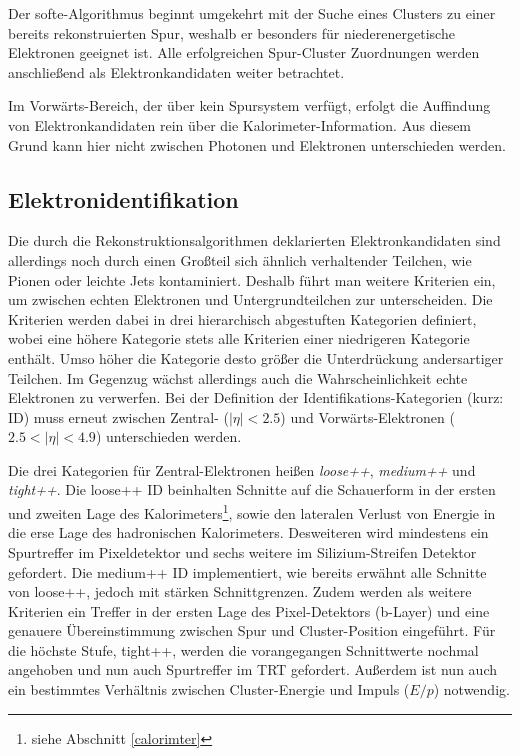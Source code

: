 Der softe-Algorithmus beginnt umgekehrt mit der Suche eines Clusters zu einer
bereits rekonstruierten Spur, weshalb er besonders für niederenergetische
Elektronen geeignet ist. Alle erfolgreichen Spur-Cluster Zuordnungen werden
anschließend als Elektronkandidaten weiter betrachtet.

Im Vorwärts-Bereich, der über kein Spursystem verfügt, erfolgt die Auffindung
von Elektronkandidaten rein über die Kalorimeter-Information. Aus diesem Grund
kann hier nicht zwischen Photonen und Elektronen unterschieden werden.



\subsection{Elektronidentifikation}
\label{identification}
Die durch die Rekonstruktionsalgorithmen deklarierten Elektronkandidaten
sind allerdings noch durch einen Großteil sich ähnlich verhaltender Teilchen,
wie Pionen oder leichte Jets kontaminiert. Deshalb führt man weitere Kriterien
ein, um zwischen echten Elektronen und Untergrundteilchen zur unterscheiden.
Die Kriterien werden dabei in drei hierarchisch abgestuften Kategorien
definiert, wobei eine höhere Kategorie stets alle Kriterien einer niedrigeren
Kategorie enthält. Umso höher die Kategorie desto größer die Unterdrückung
andersartiger Teilchen. Im Gegenzug wächst allerdings auch die
Wahrscheinlichkeit echte Elektronen zu verwerfen. Bei der Definition der
Identifikations-Kategorien (kurz: \acs{ID}) muss erneut zwischen Zentral-
($|\eta|<2.5$) und Vorwärts-Elektronen ($2.5<|\eta|<4.9$) unterschieden werden.

Die drei Kategorien für Zentral-Elektronen heißen \textit{loose++},
\textit{medium++} und \textit{tight++}. Die loose++ ID beinhalten Schnitte auf
die Schauerform in der ersten und zweiten Lage des Kalorimeters\footnote{siehe
Abschnitt \ref{calorimter}}, sowie den lateralen Verlust von Energie in die
erse Lage des hadronischen Kalorimeters. Desweiteren wird mindestens ein
Spurtreffer im Pixeldetektor und sechs weitere im Silizium-Streifen Detektor
gefordert. Die medium++ ID implementiert, wie bereits erwähnt alle Schnitte von
loose++, jedoch mit stärken Schnittgrenzen. Zudem werden als weitere Kriterien
ein Treffer in der ersten Lage des Pixel-Detektors (b-Layer) und eine genauere
Übereinstimmung zwischen Spur und Cluster-Position eingeführt. Für die höchste
Stufe, tight++, werden die vorangegangen Schnittwerte nochmal angehoben und nun
auch Spurtreffer im \ac{TRT} gefordert. Außerdem ist nun auch ein bestimmtes
Verhältnis zwischen Cluster-Energie und Impuls ($E/p$) notwendig.

